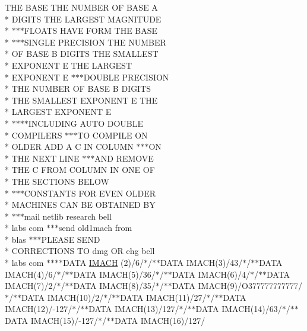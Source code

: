 \begin{DoxyCompactItemize}
\item 
T\+H\+E B\+A\+S\+E T\+H\+E N\+U\+M\+B\+E\+R O\+F B\+A\+S\+E A \\*
D\+I\+G\+I\+T\+S T\+H\+E L\+A\+R\+G\+E\+S\+T M\+A\+G\+N\+I\+T\+U\+D\+E \\*
$\ast$$\ast$$\ast$F\+L\+O\+A\+T\+S H\+A\+V\+E F\+O\+R\+M T\+H\+E B\+A\+S\+E \\*
$\ast$$\ast$$\ast$S\+I\+N\+G\+L\+E P\+R\+E\+C\+I\+S\+I\+O\+N T\+H\+E N\+U\+M\+B\+E\+R \\*
O\+F B\+A\+S\+E B D\+I\+G\+I\+T\+S T\+H\+E S\+M\+A\+L\+L\+E\+S\+T \\*
E\+X\+P\+O\+N\+E\+N\+T E T\+H\+E L\+A\+R\+G\+E\+S\+T \\*
E\+X\+P\+O\+N\+E\+N\+T E $\ast$$\ast$$\ast$D\+O\+U\+B\+L\+E P\+R\+E\+C\+I\+S\+I\+O\+N \\*
T\+H\+E N\+U\+M\+B\+E\+R O\+F B\+A\+S\+E B D\+I\+G\+I\+T\+S \\*
T\+H\+E S\+M\+A\+L\+L\+E\+S\+T E\+X\+P\+O\+N\+E\+N\+T E T\+H\+E \\*
L\+A\+R\+G\+E\+S\+T E\+X\+P\+O\+N\+E\+N\+T E \\*
$\ast$$\ast$$\ast$$\ast$I\+N\+C\+L\+U\+D\+I\+N\+G A\+U\+T\+O D\+O\+U\+B\+L\+E \\*
C\+O\+M\+P\+I\+L\+E\+R\+S $\ast$$\ast$$\ast$T\+O C\+O\+M\+P\+I\+L\+E O\+N \\*
O\+L\+D\+E\+R A\+D\+D A C I\+N C\+O\+L\+U\+M\+N $\ast$$\ast$$\ast$O\+N \\*
T\+H\+E N\+E\+X\+T L\+I\+N\+E $\ast$$\ast$$\ast$A\+N\+D R\+E\+M\+O\+V\+E \\*
T\+H\+E C F\+R\+O\+M C\+O\+L\+U\+M\+N I\+N O\+N\+E O\+F \\*
T\+H\+E S\+E\+C\+T\+I\+O\+N\+S B\+E\+L\+O\+W \\*
$\ast$$\ast$$\ast$C\+O\+N\+S\+T\+A\+N\+T\+S F\+O\+R E\+V\+E\+N O\+L\+D\+E\+R \\*
M\+A\+C\+H\+I\+N\+E\+S C\+A\+N B\+E O\+B\+T\+A\+I\+N\+E\+D B\+Y \\*
$\ast$$\ast$$\ast$mail netlib research bell \\*
labs com $\ast$$\ast$$\ast$send old1mach from \\*
blas $\ast$$\ast$$\ast$P\+L\+E\+A\+S\+E S\+E\+N\+D \\*
C\+O\+R\+R\+E\+C\+T\+I\+O\+N\+S T\+O dmg O\+R ehg bell \\*
labs com $\ast$$\ast$$\ast$$\ast$D\+A\+T\+A \hyperlink{namespaceport_a31c99d02814a98ce37ffd3eedf6e5267}{I\+M\+A\+C\+H} (2)/6/$\ast$/$\ast$$\ast$D\+A\+T\+A I\+M\+A\+C\+H(3)/43/$\ast$/$\ast$$\ast$D\+A\+T\+A I\+M\+A\+C\+H(4)/6/$\ast$/$\ast$$\ast$D\+A\+T\+A I\+M\+A\+C\+H(5)/36/$\ast$/$\ast$$\ast$D\+A\+T\+A I\+M\+A\+C\+H(6)/4/$\ast$/$\ast$$\ast$D\+A\+T\+A I\+M\+A\+C\+H(7)/2/$\ast$/$\ast$$\ast$D\+A\+T\+A I\+M\+A\+C\+H(8)/35/$\ast$/$\ast$$\ast$D\+A\+T\+A I\+M\+A\+C\+H(9)/O377777777777/$\ast$/$\ast$$\ast$D\+A\+T\+A I\+M\+A\+C\+H(10)/2/$\ast$/$\ast$$\ast$D\+A\+T\+A I\+M\+A\+C\+H(11)/27/$\ast$/$\ast$$\ast$D\+A\+T\+A I\+M\+A\+C\+H(12)/-\/127/$\ast$/$\ast$$\ast$D\+A\+T\+A I\+M\+A\+C\+H(13)/127/$\ast$/$\ast$$\ast$D\+A\+T\+A I\+M\+A\+C\+H(14)/63/$\ast$/$\ast$$\ast$D\+A\+T\+A I\+M\+A\+C\+H(15)/-\/127/$\ast$/$\ast$$\ast$D\+A\+T\+A I\+M\+A\+C\+H(16)/127/

\end{DoxyCompactItemize}
